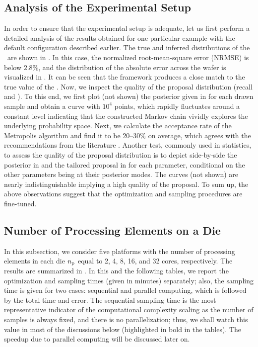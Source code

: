 \subsection{Analysis of the Experimental Setup}
In order to ensure that the experimental setup is adequate, let us first perform a detailed analysis of the results obtained for one particular example with the default configuration described earlier.
The true and inferred distributions of the \qoi\ are shown in . In this case, the normalized root-mean-square error (NRMSE) is below $2.8\%$, and the distribution of the absolute error across the wafer is visualized in . It can be seen that the framework produces a close match to the true value of the \qoi.
Now, we inspect the quality of the proposal distribution (recall  and ). To this end, we first plot (not shown) the posterior given in  for each drawn sample and obtain a curve with $10^4$ points, which rapidly fluctuates around a constant level indicating that the constructed Markov chain vividly explores the underlying probability space.
Next, we calculate the acceptance rate of the Metropolis algorithm and find it to be $20$--$30\%$ on average, which agrees with the recommendations from the literature \cite{gelman2004}.
Another test, commonly used in statistics, to assess the quality of the proposal distribution is to depict side-by-side the posterior in  and the tailored proposal in  for each parameter, conditional on the other parameters being at their posterior modes. The curves (not shown) are nearly indistinguishable implying a high quality of the proposal. To sum up, the above observations suggest that the optimization and sampling procedures are fine-tuned.

\subsection{Number of Processing Elements on a Die}
In this subsection, we consider five platforms with the number of processing elements in each die ${n_\text{p}}$ equal to 2, 4, 8, 16, and 32 cores, respectively. The results are summarized in .
In this and the following tables, we report the optimization and sampling times (given in minutes) separately; also, the sampling time is given for two cases: sequential and parallel computing, which is followed by the total time and error.
The sequential sampling time is the most representative indicator of the computational complexity scaling as the number of samples is always fixed, and there is no parallelization; thus, we shall watch this value in most of the discussions below (highlighted in bold in the tables). The speedup due to parallel computing will be discussed later on.


